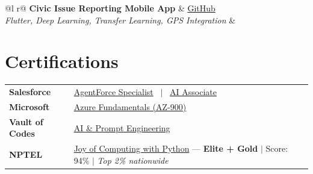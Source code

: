 \documentclass[a4paper,11pt]{article}
\begin{document}
\begin{tabularx}{\linewidth}{@{}l r@{}}
\textbf{Civic Issue Reporting Mobile App} & \hfill \href{https://github.com/SudheeHacakthon/CivicVision.git}{GitHub} \\[1pt]
\textit{Flutter, Deep Learning, Transfer Learning, GPS Integration} & \\[3pt]
\end{tabularx}

\section{Certifications}
\vspace{2pt}
\begin{tabularx}{\linewidth}{@{}l X@{}}
\textbf{Salesforce}     & \href{https://drive.google.com/file/d/1ig8ZAgni9Ml1-eQw-yYwkyeQZiyzHk-t/view?usp=share_link}{AgentForce Specialist} \ $|$ \ \href{https://drive.google.com/file/d/12eKyzIrdg2E9JL7Ei6M3PfhkW0PfKh1l/view?usp=sharing}{AI Associate} \\[2pt]
\textbf{Microsoft}      & \href{https://drive.google.com/file/d/1Uj9T80eRGSfT8G-HdICgMUi--92Ffz_9/view?usp=share_link}{Azure Fundamentals (AZ-900)} \\[2pt]
\textbf{Vault of Codes} & \href{https://drive.google.com/file/d/1ZCG5hGw_KajViTB6CHOn3X3Br9BgI-SM/view?usp=share_link}{AI \& Prompt Engineering} \\[2pt]
\textbf{NPTEL}          & \href{https://drive.google.com/file/d/1xy7yMiITQlHQ5rMfqnr1E25GgKLNywxe/view?usp=share_link}{Joy of Computing with Python} --- \textbf{Elite + Gold} $|$ Score: 94\% $|$ \textit{Top 2\% nationwide} \\
\end{tabularx}
\end{document}
